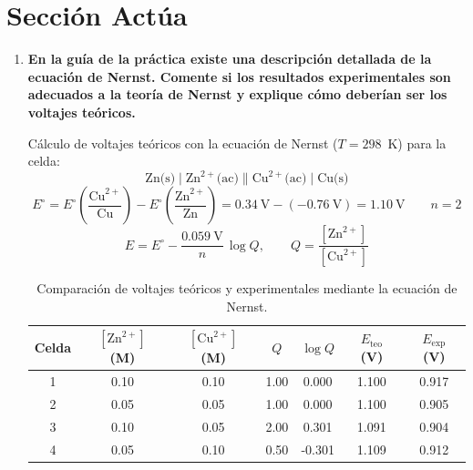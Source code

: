 \documentclass[12pt]{article}
\begin{document}
\section{Sección Actúa}

\begin{enumerate}[label=\textbf{\alph*)}, leftmargin=1.2cm]

    \item \textbf{En la guía de la práctica existe una descripción detallada
          de la ecuación de Nernst. Comente si los resultados experimentales
          son adecuados a la teoría de Nernst y explique cómo deberían ser
          los voltajes teóricos.}

    Cálculo de voltajes teóricos con la ecuación de Nernst ($T = 298$~K) para
    la celda:
    \[
        \text{Zn(s)} \mid \text{Zn}^{2+}\text{(ac)}
        \parallel
        \text{Cu}^{2+}\text{(ac)} \mid \text{Cu(s)}
    \]
    \[
        E^\circ = E^\circ\!\left(\frac{\text{Cu}^{2+}}{\text{Cu}}\right)
                - E^\circ\!\left(\frac{\text{Zn}^{2+}}{\text{Zn}}\right)
                = 0.34\ \text{V} - (-0.76\ \text{V}) = 1.10\ \text{V}
        \qquad n = 2
    \]
    \[
        E = E^\circ - \frac{0.059\ \text{V}}{n}\,\log Q,
        \qquad
        Q = \frac{[\text{Zn}^{2+}]}{[\text{Cu}^{2+}]}
    \]

    \begin{table}[h!]
    \centering
    \renewcommand{\arraystretch}{1.5}
    \begin{tabular}{|c|c|c|c|c|c|c|}
    \hline
    \textbf{Celda} &
    \textbf{$[\text{Zn}^{2+}]$ (M)} &
    \textbf{$[\text{Cu}^{2+}]$ (M)} &
    \textbf{$Q$} &
    \textbf{$\log Q$} &
    \textbf{$E_\text{teo}$ (V)} &
    \textbf{$E_\text{exp}$ (V)} \\ \hline
    1 & 0.10 & 0.10 & 1.00 &  0.000 & 1.100 & 0.917 \\ \hline
    2 & 0.05 & 0.05 & 1.00 &  0.000 & 1.100 & 0.905 \\ \hline
    3 & 0.10 & 0.05 & 2.00 &  0.301 & 1.091 & 0.904 \\ \hline
    4 & 0.05 & 0.10 & 0.50 & -0.301 & 1.109 & 0.912 \\ \hline
    \end{tabular}
    \caption{Comparación de voltajes teóricos y experimentales mediante la
             ecuación de Nernst.}
    \label{tab:nernst}
    \end{table}


\end{enumerate}
\end{document}
